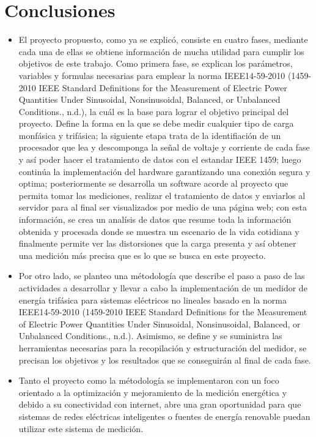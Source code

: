 {\clearpage}
\chapter{ Conclusiones}

\begin{itemize}
    \itemsep0em
    \item El proyecto propuesto, como ya se explicó, consiste en cuatro fases, mediante cada una de ellas se obtiene información de mucha utilidad para cumplir los objetivos de este trabajo. Como primera fase, se explican los parámetros, variables y formulas necesarias para emplear la norma IEEE14-59-2010 (1459-2010 IEEE Standard Definitions for the Measurement of Electric Power Quantities Under Sinusoidal, Nonsinusoidal, Balanced, or Unbalanced Conditions., n.d.), la cuál es la base para lograr el objetivo principal del proyecto. Define la forma en la que se debe medir cualquier tipo de carga monfásica y trifásica; la siguiente etapa trata de la identifiación de un procesador que lea y descomponga la señal de voltaje y corriente de cada fase y así poder hacer el tratamiento de datos con el estandar IEEE 1459; luego continúa la implementación del hardware garantizando una conexión segura y optima; posteriormente se desarrolla un software acorde al proyecto que permita tomar las mediciones, realizar el tratamiento de datos y enviarlos al servidor para al final ser visualizados por medio de una página web; con esta información, se crea un analísis de datos que resume toda la información obtenida y procesada donde se muestra un escenario de la vida cotidiana y finalmente permite ver las distorsiones que la carga presenta y así obtener una medición más precisa que es lo que se busca en este proyecto.
    \item Por otro lado, se planteo una métodología que describe el paso a paso de las actividades a desarrollar y llevar a cabo la implementación de un medidor de energía trifásica para sistemas eléctricos no lineales basado en la norma IEEE14-59-2010 (1459-2010 IEEE Standard Definitions for the Measurement of Electric Power Quantities Under Sinusoidal, Nonsinusoidal, Balanced, or Unbalanced Conditions., n.d.). Asimismo, se define y se suministra las herramientas necesarias para la recopilación y estructuración del medidor, se precisan los objetivos y los resultados que se conseguirán al final de cada fase.
    \item Tanto el proyecto como la métodología se implementaron con un foco orientado a la optimización y mejoramiento de la medición energética y debido a su conectividad con internet, abre una gran oportunidad para que sistemas de redes eléctricas inteligentes o fuentes de energía renovable puedan utilizar este sistema de medición.

\end{itemize}
